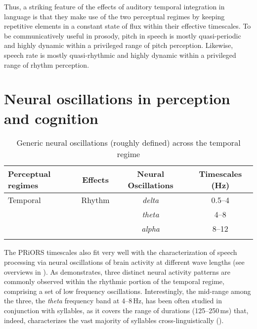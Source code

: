 
Thus, a striking feature of the effects of %
auditory temporal integration
in language is that they make use of the two perceptual regimes by keeping repetitive elements in a constant state of flux within their effective timescales. To be communicatively useful in prosody, pitch in speech is mostly quasi-periodic and highly dynamic within a privileged range of pitch perception. Likewise,
speech rate is mostly quasi-rhythmic and highly dynamic within a privileged range of rhythm perception.

\section{Neural oscillations in perception and cognition}\label{sec:neuro}

\begin{table}
\caption{\label{tab:oscillationsTimeScales}Generic neural oscillations (roughly defined) across the temporal regime}
\begin{tabular}{lccc}
\lsptoprule
Perceptual regimes & Effects & Neural Oscillations & Timescales (Hz)  \\
\midrule
Temporal & Rhythm &  \emph{delta} & 0.5--4\phantom{2} \\
&   &                \emph{theta} & \phantom{0.}4--8\phantom{2} \\
&   &                \emph{alpha} & \phantom{0.}8--12 \\
\lspbottomrule
\end{tabular}
\end{table}

The PRiORS timescales also fit very well with the characterization of speech processing via neural oscillations of brain activity at different wave lengths (see overviews in \citealt{buzsaki2006rhythms, myers2019pushing, poeppel2020speech}). As  demonstrates, three distinct neural activity patterns are commonly observed within the rhythmic portion of the temporal regime, comprising a set of low frequency oscillations. Interestingly, the mid-range among the three, the \emph{theta} frequency band at 4--8\,Hz, has been often studied in conjunction with syllables, as it covers the range of durations (125--250\,ms) that, indeed, characterizes the vast majority of syllables cross-linguistically (\citealt{ding2014robust, ding2017temporal, gross2013speech, keitel2017auditory, luo2010auditory, poeppel2020speech}).

